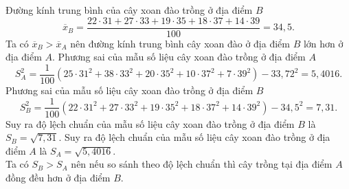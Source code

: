\begin{ex}[Mức độ 3]
{\begin{itemchoice}
			Đường kính trung bình của cây xoan đào trồng ở địa điểm $B$ 
			$$ \overline{x}_B=\dfrac{22\cdot31+27\cdot33+19\cdot35+18\cdot37+14\cdot39}{100}=34{,}5.$$
			Ta có $\overline{x}_B>\overline{x}_A$ nên đường kính trung bình cây xoan đào ở địa điểm $ B $ lớn hơn ở địa điểm $ A $.
			\itemch  Phương sai của mẫu số liệu cây xoan đào trồng ở địa điểm $ A $
			$$ S_A^2=\dfrac{1}{100}\left(25\cdot31^2+38\cdot33^2+20\cdot35^2+10\cdot37^2+7\cdot39^2 \right)- 33{,}72^2=5{,}4016. $$
			\itemch  Phương sai của mẫu số liệu cây xoan đào trồng ở địa điểm $ B $
			$$ S_B^2=\dfrac{1}{100}\left(22\cdot31^2+27\cdot33^2+19\cdot35^2+18\cdot37^2+14\cdot39^2 \right)- 34{,}5^2=7{,}31. $$
			Suy ra độ lệch chuẩn của mẫu số liệu cây xoan đào trồng ở địa điểm $ B $ là $ S_B=\sqrt{7{,}31} $.
			\itemch 
			Suy ra độ lệch chuẩn của mẫu số liệu cây xoan đào trồng ở địa điểm $ A $ là $ S_A=\sqrt{5{,}4016} $.\\
			Ta có $ S_B > S_A $ nên nếu so sánh theo độ lệch chuẩn thì cây trồng tại địa điểm $ A $ đồng đều hơn ở địa điểm $ B $.
		\end{itemchoice}
	}
\end{ex}

